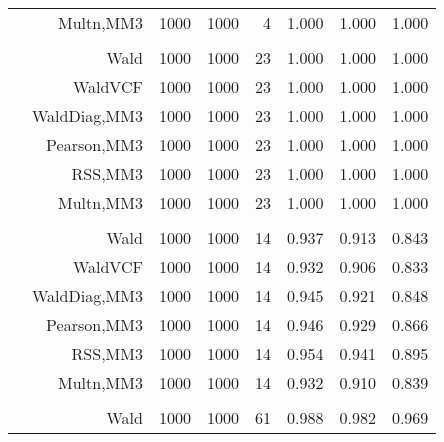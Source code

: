 \documentclass[
]{article}
\begin{document}
\begin{table}[H]
{\begin{tabular}[t]{lrrrrrrr}
\hspace{1em} & Multn,MM3 & 1000 & 1000 & 4 & 1.000 & 1.000 & 1.000\\
\cmidrule{1-8}
\addlinespace[0.3em]
\multicolumn{8}{l}{\textbf{1F 15V}}\\
\hspace{1em} & Wald & 1000 & 1000 & 23 & 1.000 & 1.000 & 1.000\\

\hspace{1em} & WaldVCF & 1000 & 1000 & 23 & 1.000 & 1.000 & 1.000\\

\hspace{1em} & WaldDiag,MM3 & 1000 & 1000 & 23 & 1.000 & 1.000 & 1.000\\

\hspace{1em} & Pearson,MM3 & 1000 & 1000 & 23 & 1.000 & 1.000 & 1.000\\

\hspace{1em} & RSS,MM3 & 1000 & 1000 & 23 & 1.000 & 1.000 & 1.000\\

\hspace{1em} & Multn,MM3 & 1000 & 1000 & 23 & 1.000 & 1.000 & 1.000\\
\cmidrule{1-8}
\addlinespace[0.3em]
\multicolumn{8}{l}{\textbf{2F 10V}}\\
\hspace{1em} & Wald & 1000 & 1000 & 14 & 0.937 & 0.913 & 0.843\\

\hspace{1em} & WaldVCF & 1000 & 1000 & 14 & 0.932 & 0.906 & 0.833\\

\hspace{1em} & WaldDiag,MM3 & 1000 & 1000 & 14 & 0.945 & 0.921 & 0.848\\

\hspace{1em} & Pearson,MM3 & 1000 & 1000 & 14 & 0.946 & 0.929 & 0.866\\

\hspace{1em} & RSS,MM3 & 1000 & 1000 & 14 & 0.954 & 0.941 & 0.895\\

\hspace{1em} & Multn,MM3 & 1000 & 1000 & 14 & 0.932 & 0.910 & 0.839\\
\cmidrule{1-8}
\addlinespace[0.3em]
\multicolumn{8}{l}{\textbf{3F 15V}}\\
\hspace{1em} & Wald & 1000 & 1000 & 61 & 0.988 & 0.982 & 0.969\\


\end{tabular}}
\end{table}
\end{document}
